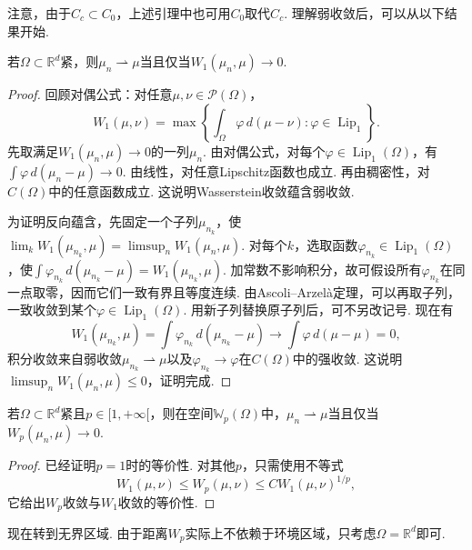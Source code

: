 注意，由于$C_c\subset C_0$，上述引理中也可用$C_0$取代$C_c$. 理解弱收敛后，可以从以下结果开始.

\begin{theorem}\label{obj:5.9}
若$\Omega\subset\mathbb R^d$紧，则$\mu_n\rightharpoonup\mu$当且仅当$W_1(\mu_n,\mu)\to0$.
\end{theorem}
\begin{proof}
回顾对偶公式：对任意$\mu,\nu\in\mathscr P(\Omega)$，
\[
W_1(\mu,\nu)=\max\left\{\int_\Omega\varphi\,d(\mu-\nu):\varphi\in\operatorname{Lip}_1\right\}.
\]
先取满足$W_1(\mu_n,\mu)\to0$的一列$\mu_n$. 由对偶公式，对每个$\varphi\in\operatorname{Lip}_1(\Omega)$，有$\int\varphi\,d(\mu_n-\mu)\to0$. 由线性，对任意Lipschitz函数也成立. 再由稠密性，对$C(\Omega)$中的任意函数成立. 这说明Wasserstein收敛蕴含弱收敛.

为证明反向蕴含，先固定一个子列$\mu_{n_k}$，使$\lim_kW_1(\mu_{n_k},\mu)=\limsup_nW_1(\mu_n,\mu)$. 对每个$k$，选取函数$\varphi_{n_k}\in\operatorname{Lip}_1(\Omega)$，使$\int\varphi_{n_k}\,d(\mu_{n_k}-\mu)=W_1(\mu_{n_k},\mu)$. 加常数不影响积分，故可假设所有$\varphi_{n_k}$在同一点取零，因而它们一致有界且等度连续. 由Ascoli--Arzelà定理，可以再取子列，一致收敛到某个$\varphi\in\operatorname{Lip}_1(\Omega)$. 用新子列替换原子列后，可不另改记号. 现在有
\[
W_1(\mu_{n_k},\mu)=\int\varphi_{n_k}\,d(\mu_{n_k}-\mu)
\longrightarrow\int\varphi\,d(\mu-\mu)=0,
\]
积分收敛来自弱收敛$\mu_{n_k}\rightharpoonup\mu$以及$\varphi_{n_k}\to\varphi$在$C(\Omega)$中的强收敛. 这说明$\limsup_n\allowbreak W_1(\mu_n,\mu)\le0$，证明完成.
\end{proof}

\begin{theorem}\label{obj:5.10}
若$\Omega\subset\mathbb R^d$紧且$p\in[1,+\infty[$，则在空间$\mathbb W_p(\Omega)$中，$\mu_n\rightharpoonup\mu$当且仅当$W_p(\mu_n,\mu)\to0$.
\end{theorem}
\begin{proof}
已经证明$p=1$时的等价性. 对其他$p$，只需使用不等式
\[
W_1(\mu,\nu)\le W_p(\mu,\nu)\le C W_1(\mu,\nu)^{1/p},
\]
它给出$W_p$收敛与$W_1$收敛的等价性.
\end{proof}

现在转到无界区域. 由于距离$W_p$实际上不依赖于环境区域，只考虑$\Omega=\mathbb R^d$即可.

